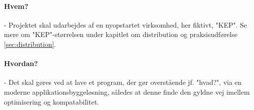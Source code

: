 \paragraph{Hvem?} - Projektet skal udarbejdes af en nyopstartet virksomhed, her fiktivt, "KEP". Se mere om "KEP"-størrelsen under kapitlet om distribution og praksisudførelse \ref{sec:distribution}.
\paragraph{Hvordan?} - Det skal gøres ved at lave et program, der gør overstående jf. "hvad?", via en moderne applikationsbyggeløsning, således at denne finde den gyldne vej imellem optimisering og kompatabilitet.

